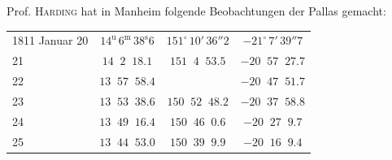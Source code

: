 \par\indent Prof. \textsc{Harding} hat in Manheim folgende Beobachtungen der Pallas gemacht:
\begin{center}\fontsize{10}{12}\selectfont\setlength{\tabcolsep}{4pt}\renewcommand{\arraystretch}{1.15}
\begin{tabular}{l|c|c|c}
1811 Januar 20 & $14^{\mathrm u}\,6^{\mathrm m}\,38^{\mathrm s}6$ & $151^\circ\,10'\,36''2$ & $-21^\circ\,7'\,39''7$ \\
\phantom{1811 Januar }21 & $14\;\;2\;\;18.1$ & $151\;\;4\;\;53.5$ & $-20\;\;57\;\;27.7$ \\
\phantom{1811 Januar }22 & $13\;\;57\;\;58.4$ & & $-20\;\;47\;\;51.7$ \\
\phantom{1811 Januar }23 & $13\;\;53\;\;38.6$ & $150\;\;52\;\;48.2$ & $-20\;\;37\;\;58.8$ \\
\phantom{1811 Januar }24 & $13\;\;49\;\;16.4$ & $150\;\;46\;\;0.6$ & $-20\;\;27\;\;9.7$ \\
\phantom{1811 Januar }25 & $13\;\;44\;\;53.0$ & $150\;\;39\;\;9.9$ & $-20\;\;16\;\;9.4$ \\
\end{tabular}
\end{center}


